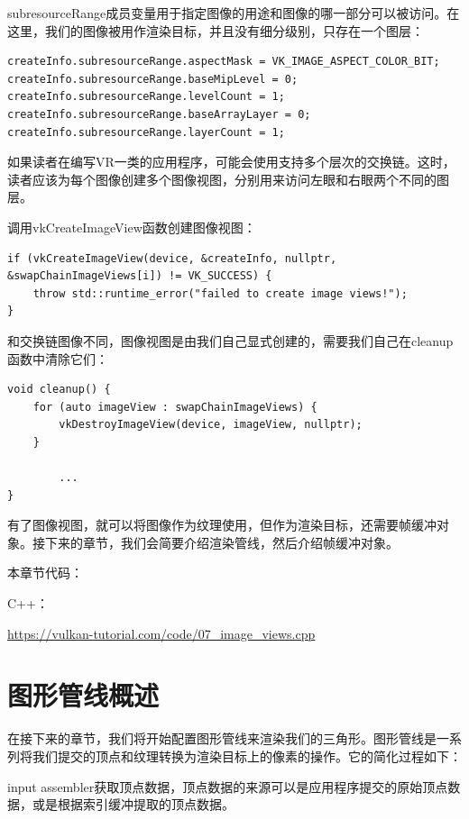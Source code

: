 \documentclass{ctexart}
\begin{document}
subresourceRange成员变量用于指定图像的用途和图像的哪一部分可以被访问。在这里，我们的图像被用作渲染目标，并且没有细分级别，只存在一个图层：

\begin{lstlisting}[language={[ANSI]C}]
createInfo.subresourceRange.aspectMask = VK_IMAGE_ASPECT_COLOR_BIT;
createInfo.subresourceRange.baseMipLevel = 0;
createInfo.subresourceRange.levelCount = 1;
createInfo.subresourceRange.baseArrayLayer = 0;
createInfo.subresourceRange.layerCount = 1;
\end{lstlisting}

如果读者在编写VR一类的应用程序，可能会使用支持多个层次的交换链。这时，读者应该为每个图像创建多个图像视图，分别用来访问左眼和右眼两个不同的图层。

调用vkCreateImageView函数创建图像视图：

\begin{lstlisting}[language={[ANSI]C}]
if (vkCreateImageView(device, &createInfo, nullptr, &swapChainImageViews[i]) != VK_SUCCESS) {
	throw std::runtime_error("failed to create image views!");
}
\end{lstlisting}

和交换链图像不同，图像视图是由我们自己显式创建的，需要我们自己在cleanup函数中清除它们：

\begin{lstlisting}[language={[ANSI]C}]
void cleanup() {
	for (auto imageView : swapChainImageViews) {
		vkDestroyImageView(device, imageView, nullptr);
	}

		...
}
\end{lstlisting}

有了图像视图，就可以将图像作为纹理使用，但作为渲染目标，还需要帧缓冲对象。接下来的章节，我们会简要介绍渲染管线，然后介绍帧缓冲对象。

本章节代码：

C++：

\url{https://vulkan-tutorial.com/code/07_image_views.cpp}

\newpage
\section{图形管线概述}


在接下来的章节，我们将开始配置图形管线来渲染我们的三角形。图形管线是一系列将我们提交的顶点和纹理转换为渲染目标上的像素的操作。它的简化过程如下：

input assembler获取顶点数据，顶点数据的来源可以是应用程序提交的原始顶点数据，或是根据索引缓冲提取的顶点数据。
\end{document}
